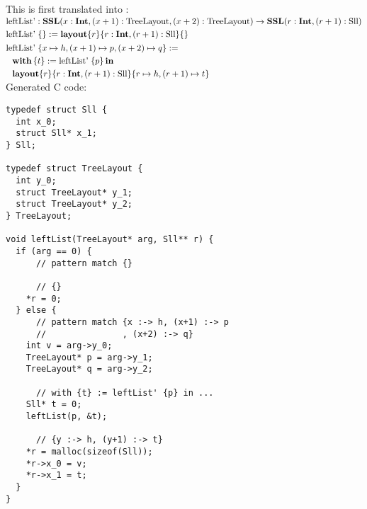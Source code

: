 %
%
%
%

\noindent
This is first translated into \PikaCore:
\\

$\begin{aligned}
  &\textrm{leftList'} : \textbf{SSL}(x : \textbf{Int}, (x+1) : \textrm{TreeLayout}, (x+2) : \textrm{TreeLayout}) \rightarrow \textbf{SSL}(r : \textbf{Int}, (r+1) : \textrm{Sll})\\
  &\textrm{leftList'}\; \{\} := \textbf{layout}\{ r \}\{ r : \textbf{Int}, (r+1) : \textrm{Sll} \}\{  \}\\
  &\begin{aligned}
    \textrm{le}&\textrm{ftList'}\; \{x \mapsto h, (x+1) \mapsto p, (x+2) \mapsto q\} :=\\
      &\textbf{with}\,\{t\} := \textrm{leftList'}\; \{p\}\,\textbf{in}\,\\
      &\textbf{layout}\{ r \}\{ r : \textbf{Int}, (r+1) : \textrm{Sll} \}\{ r \mapsto h, (r+1) \mapsto t \}
   \end{aligned}
\end{aligned}$
\\


\noindent
Generated C code:

\begin{lstlisting}
typedef struct Sll {
  int x_0;
  struct Sll* x_1;
} Sll;

typedef struct TreeLayout {
  int y_0;
  struct TreeLayout* y_1;
  struct TreeLayout* y_2;
} TreeLayout;

void leftList(TreeLayout* arg, Sll** r) {
  if (arg == 0) {
      // pattern match {}

      // {}
    *r = 0;
  } else {
      // pattern match {x :-> h, (x+1) :-> p
      //               , (x+2) :-> q}
    int v = arg->y_0;
    TreeLayout* p = arg->y_1;
    TreeLayout* q = arg->y_2;

      // with {t} := leftList' {p} in ...
    Sll* t = 0;
    leftList(p, &t);

      // {y :-> h, (y+1) :-> t}
    *r = malloc(sizeof(Sll));
    *r->x_0 = v;
    *r->x_1 = t;
  }
}
\end{lstlisting}

